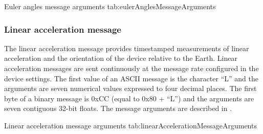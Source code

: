 \begingroup
    \def\tempArgumentA{Roll angle in degrees}
    \def\tempArgumentB{Pitch angle in degrees}
    \def\tempArgumentC{Yaw angle in degrees}
    \dataMessageTable
    {Euler angles message arguments}
    {tab:eulerAnglesMessageArguments}
\endgroup

\begingroup
    \def\tempNameA{Roll angle}
    \def\tempNameB{Pitch angle}
    \def\tempNameC{Yaw angle}
    \def\tempValueA{0}
    \def\tempValueB{0}
    \def\tempValueC{0}
    \def\tempAsciiFirst{A}
    \def\tempAsciiA{0.0000}
    \def\tempAsciiB{0.0000}
    \def\tempAsciiC{0.0000}
    \def\tempBinaryFirst{C1}
    \def\tempBinaryA{00 00 00 00}
    \def\tempBinaryB{00 00 00 00}
    \def\tempBinaryC{00 00 00 00}
    \dataMessageExample
\endgroup

\subsubsection{Linear acceleration message}

The linear acceleration message provides timestamped measurements of linear acceleration and the orientation of the device relative to the Earth.  Linear acceleration messages are sent continuously at the message rate configured in the device settings.  The first value of an \ac{ASCII} message is the character \enquote{L} and the arguments are seven numerical values expressed to four decimal places.  The first byte of a binary message is 0xCC (equal to 0x80 + \enquote{L}) and the arguments are seven contiguous 32-bit floats.  The message arguments are described in .

\begingroup
    \def\tempArgumentA{Quaternion W element}
    \def\tempArgumentB{Quaternion X element}
    \def\tempArgumentC{Quaternion Y element}
    \def\tempArgumentD{Quaternion Z element}
    \def\tempArgumentE{Linear acceleration X axis in g}
    \def\tempArgumentF{Linear acceleration Y axis in g}
    \def\tempArgumentG{Linear acceleration Z axis in g}
    \def\tempCaption{Linear acceleration message arguments}
    \def\tempLabel{tab:linearAccelerationMessageArguments}
    \dataMessageTable
    {Linear acceleration message arguments}
    {tab:linearAccelerationMessageArguments}
\endgroup

\begingroup
    \def\tempNameA{Quaternion W element}
    \def\tempNameB{Quaternion X element}
    \def\tempNameC{Quaternion Y element}
    \def\tempNameD{Quaternion Z element}
    \def\tempNameE{Linear acceleration X axis}
    \def\tempNameF{Linear acceleration Y axis}
    \def\tempNameG{Linear acceleration Z axis}
    \def\tempValueA{1}
    \def\tempValueB{0}
    \def\tempValueC{0}
    \def\tempValueD{0}
    \def\tempValueE{0}
    \def\tempValueF{0}
    \def\tempValueG{0}
    \def\tempAsciiFirst{L}
    \def\tempAsciiA{1.0000}
    \def\tempAsciiB{0.0000}
    \def\tempAsciiC{0.0000}
    \def\tempAsciiD{0.0000}
    \def\tempAsciiE{0.0000}
    \def\tempAsciiF{0.0000}
    \def\tempAsciiG{0.0000}
    \def\tempBinaryFirst{CC}
    \def\tempBinaryA{00 00 80 3F}
    \def\tempBinaryB{00 00 00 00}
    \def\tempBinaryC{00 00 00 00}
    \def\tempBinaryD{00 00 00 00}
    \def\tempBinaryE{00 00 00 00}
    \def\tempBinaryF{00 00 00 00}
    \def\tempBinaryG{00 00 00 00}
    \dataMessageExample
\endgroup

